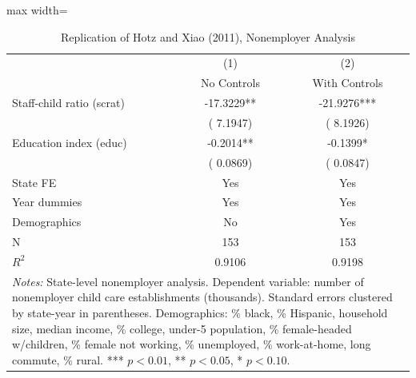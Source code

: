 \begin{table}[htbp]
\centering
\caption{Replication of Hotz and Xiao (2011), Nonemployer Analysis}
\label{tab:hotz_xiao_nonemp}
\begin{adjustbox}{max width=\textwidth}
\begin{tabular}{lcc}
\toprule
 & (1) & (2) \\
 & No Controls & With Controls \\
\midrule
Staff-child ratio (scrat) &  -17.3229** &  -21.9276*** \\
 & (   7.1947) & (   8.1926) \\
\addlinespace
Education index (educ) &   -0.2014** &   -0.1399* \\
 & (   0.0869) & (   0.0847) \\
\midrule
State FE & Yes & Yes \\
Year dummies & Yes & Yes \\
Demographics & No & Yes \\
\midrule
N &       153 &       153 \\
$R^2$ & 0.9106 & 0.9198 \\
\bottomrule
\multicolumn{3}{p{0.85\linewidth}}{\footnotesize
\textit{Notes:} State-level nonemployer analysis. 
Dependent variable: number of nonemployer child care establishments (thousands). 
Standard errors clustered by state-year in parentheses. 
Demographics: \% black, \% Hispanic, household size, median income, 
\% college, under-5 population, \% female-headed w/children, 
\% female not working, \% unemployed, \% work-at-home, 
long commute, \% rural. 
*** $p<0.01$, ** $p<0.05$, * $p<0.10$.}
\end{tabular}
\end{adjustbox}
\end{table}
